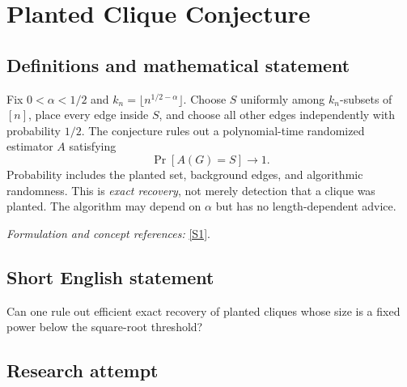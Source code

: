 \documentclass[11pt,a4paper]{article}
\newcommand{\sref}[2]{\hyperlink{source:#1:#2}{[S#2]}}
\newif\ifshowcatalogue
\newcommand{\cataloguescope}[1]{\ifshowcatalogue
 \paragraph{Exact scope in the supplied catalogue.}
 \begin{quote}\small #1\end{quote}\fi}
\numberwithin{equation}{section}
\begin{document}
\setcounter{section}{0}
\clearpage
\section*{\texorpdfstring{Planted Clique Conjecture}{Planted Clique Conjecture}}\label{30006743}
\subsection{Definitions and mathematical statement}
Fix $0<\alpha<1/2$ and $k_n=\lfloor n^{1/2-\alpha}\rfloor$. Choose $S$ uniformly among $k_n$-subsets of $[n]$, place every edge inside $S$, and choose all other edges independently with probability $1/2$. The conjecture rules out a polynomial-time randomized estimator $A$ satisfying
\[
 \Pr[A(G)=S]\longrightarrow1.
\]
Probability includes the planted set, background edges, and algorithmic randomness. This is \emph{exact recovery}, not merely detection that a clique was planted. The algorithm may depend on $\alpha$ but has no length-dependent advice.
\par\smallskip\textit{Formulation and concept references:} \sref{30006743}{1}.
\cataloguescope{For every fixed real alpha with 0<alpha<1/2, set k\_n=floor(n\textasciicircum{}(1/2-alpha)). Sample a uniform k\_n-subset S of n labeled vertices, put every edge inside S, and independently include each other edge with probability1/2. There is no randomized algorithm running in time polynomial in n that, given this graph, outputs exactly S with probability tending to1 as n tends to infinity, over S, remaining edges and its internal coins. Algorithms may depend on the fixed alpha but receive no advice depending on n.}
\subsection{Short English statement}
Can one rule out efficient exact recovery of planted cliques whose size is a fixed power below the square-root threshold?
\subsection{Research attempt}
\end{document}
